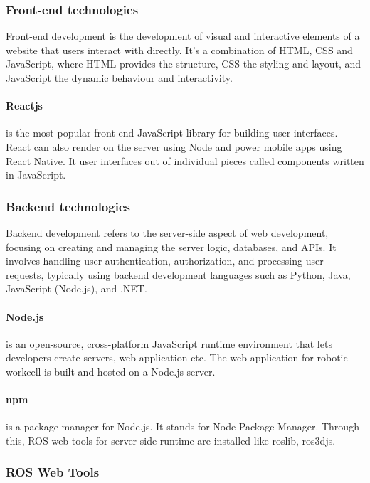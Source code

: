 
\subsubsection{Front-end technologies}
\label{subsubsec:frontend}
Front-end development is the development of visual and interactive elements of a website that users interact with directly. It's a combination
of HTML, CSS and JavaScript, where HTML provides the structure, CSS the styling and layout, and JavaScript the dynamic behaviour and interactivity.
\cite{frontend}

\paragraph{Reactjs}
\label{par:reactjs}
is the most popular front-end JavaScript library for building user interfaces. React can also render on the server using Node and power mobile
apps using React Native. It user interfaces out of individual pieces called components written in JavaScript.
\cite{reactjs}

\subsubsection{Backend technologies}
\label{subsubsec:backend}

Backend development refers to the server-side aspect of web development, focusing on creating and managing the server logic, databases,
and APIs. It involves handling user authentication, authorization, and processing user requests, typically using backend development
languages such as Python, Java, JavaScript (Node.js), and .NET. \cite{backend}

\paragraph{Node.js}
\label{par:nodejs}
is an open-source, cross-platform JavaScript runtime environment that lets developers create servers, web application etc.
The web application for robotic workcell is built and hosted on a Node.js server. \cite{nodejs}

\paragraph{npm}
\label{par:npm}
is a package manager for Node.js. It stands for Node Package Manager. Through this, ROS web tools for server-side runtime are installed like
roslib, ros3djs. \cite{npm}

\subsubsection{ROS Web Tools}
\label{subsubsec:rosweb}


